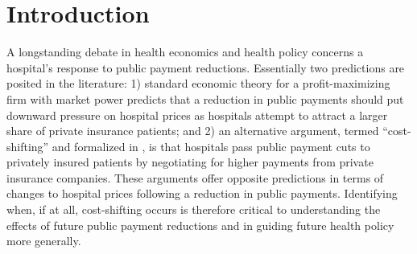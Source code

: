 \documentclass[12pt]{article}
\begin{document}
\newpage
\section{Introduction}
A longstanding debate in health economics and health policy concerns a hospital's response to public payment reductions. Essentially two predictions are posited in the literature: 1) standard economic theory for a profit-maximizing firm with market power predicts that a reduction in public payments should put downward pressure on hospital prices as hospitals attempt to attract a larger share of private insurance patients; and 2) an alternative argument, termed ``cost-shifting'' and formalized in \cite{dranove1988}, is that hospitals pass public payment cuts to privately insured patients by negotiating for higher payments from private insurance companies. These arguments offer opposite predictions in terms of changes to hospital prices following a reduction in public payments. Identifying when, if at all, cost-shifting occurs is therefore critical to understanding the effects of future public payment reductions and in guiding future health policy more generally.
\end{document}
